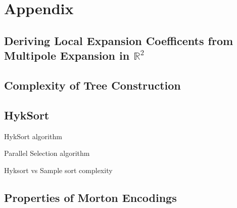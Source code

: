 \chapter{Appendix}

\section{Deriving Local Expansion Coefficents from Multipole Expansion in $\mathbb{R}^2$}\label{app:a_1_fmm_algorithm}

\section{Complexity of Tree Construction}\label{app:a_2_complexity_tree_construction}


\section{HykSort}\label{app:a_3:hyksort}

HykSort algorithm

Parallel Selection algorithm


Hyksort vs Sample sort complexity

\section{Properties of Morton Encodings}\label{app:a_4:morton}